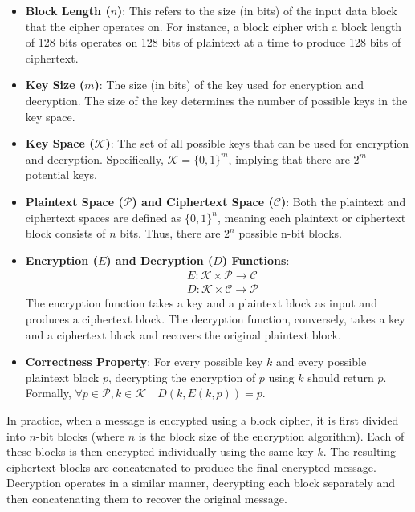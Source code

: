 \documentclass[12pt]{article}
\begin{document}
\begin{itemize}
    \item \textbf{Block Length (\( n \))}: This refers to the size (in bits) of the input data block that the cipher operates on. For instance, a block cipher with a block length of 128 bits operates on 128 bits of plaintext at a time to produce 128 bits of ciphertext.

    \item \textbf{Key Size (\( m \))}: The size (in bits) of the key used for encryption and decryption. The size of the key determines the number of possible keys in the key space.

    \item \textbf{Key Space (\( \mathcal{K} \))}: The set of all possible keys that can be used for encryption and decryption. Specifically, \( \mathcal{K} = \{0,1\}^m \), implying that there are \( 2^m \) potential keys.

    \item \textbf{Plaintext Space (\( \mathcal{P} \)) and Ciphertext Space (\( \mathcal{C} \))}: Both the plaintext and ciphertext spaces are defined as \( \{0,1\}^n \), meaning each plaintext or ciphertext block consists of \( n \) bits. Thus, there are \( 2^n \) possible n-bit blocks.

    \item \textbf{Encryption (\( E \)) and Decryption (\( D \)) Functions}: 
    \begin{align*}
        & E: \mathcal{K} \times \mathcal{P} \rightarrow \mathcal{C} \\
        & D: \mathcal{K} \times \mathcal{C} \rightarrow \mathcal{P}
    \end{align*}
    The encryption function takes a key and a plaintext block as input and produces a ciphertext block. The decryption function, conversely, takes a key and a ciphertext block and recovers the original plaintext block.

    \item \textbf{Correctness Property}: For every possible key \( k \) and every possible plaintext block \( p \), decrypting the encryption of \( p \) using \( k \) should return \( p \). Formally, \( \forall p \in \mathcal{P}, k \in \mathcal{K} \quad D(k, E(k, p)) = p \).
\end{itemize}

In practice, when a message is encrypted using a block cipher, it is first divided into \( n \)-bit blocks (where \( n \) is the block size of the encryption algorithm). Each of these blocks is then encrypted individually using the same key \( k \). The resulting ciphertext blocks are concatenated to produce the final encrypted message. Decryption operates in a similar manner, decrypting each block separately and then concatenating them to recover the original message.
\end{document}
